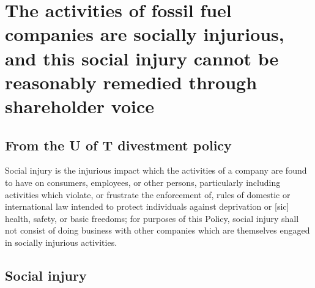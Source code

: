 


		\singlespacing
		\section{The activities of fossil fuel companies are socially injurious, and this social injury cannot be reasonably remedied through shareholder voice}
		\label{sec:SocialInjury}
		\doublespacing






	\subsection{From the U of T divestment policy}



\begin{itquote}
Social injury is the injurious impact which the activities of a company are found to have on consumers, employees, or other persons, particularly including activities which violate, or frustrate the enforcement of, rules of domestic or international law intended to protect individuals against deprivation or [sic] health, safety, or basic freedoms; for purposes of this Policy, social injury shall not consist of doing business with other companies which are themselves engaged in socially injurious activities.
\end{itquote}



	\subsection{Social injury}


